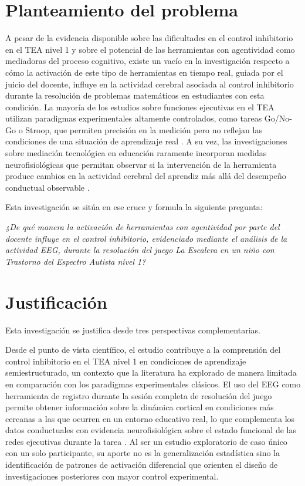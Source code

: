 \documentclass{book}
\begin{document}
\section{Planteamiento del problema}

A pesar de la evidencia disponible sobre las 
dificultades en el control inhibitorio en el TEA 
nivel 1 y sobre el potencial de las herramientas 
con agentividad como mediadoras del proceso 
cognitivo, existe un vacío en la investigación 
respecto a cómo la activación de este tipo de 
herramientas en tiempo real, guiada por el juicio 
del docente, influye en la actividad cerebral 
asociada al control inhibitorio durante la 
resolución de problemas matemáticos en estudiantes 
con esta condición. La mayoría de los estudios 
sobre funciones ejecutivas en el TEA utilizan 
paradigmas experimentales altamente controlados, 
como tareas Go/No-Go o Stroop, que permiten 
precisión en la medición pero no reflejan las 
condiciones de una situación de aprendizaje real 
\cite{Geurts2009, Hill2004}. A su vez, las 
investigaciones sobre mediación tecnológica en 
educación raramente incorporan medidas 
neurofisiológicas que permitan observar si la 
intervención de la herramienta produce cambios 
en la actividad cerebral del aprendiz más allá 
del desempeño conductual observable 
\cite{PaezGonzalez2022}.

Esta investigación se sitúa en ese cruce y 
formula la siguiente pregunta:

\vspace{3mm}
\begin{center}
\textit{¿De qué manera la activación de herramientas 
con agentividad por parte del docente influye en 
el control inhibitorio, evidenciado mediante el 
análisis de la actividad EEG, durante la resolución 
del juego La Escalera en un niño con Trastorno
del Espectro Autista nivel 1?}
\end{center}
\vspace{3mm}

\section{Justificación}

Esta investigación se justifica desde tres 
perspectivas complementarias.

Desde el punto de vista científico, el estudio 
contribuye a la comprensión del control inhibitorio 
en el TEA nivel 1 en condiciones de aprendizaje 
semiestructurado, un contexto que la literatura 
ha explorado de manera limitada en comparación 
con los paradigmas experimentales clásicos. 
El uso del EEG como herramienta de registro 
durante la sesión completa de resolución del 
juego permite obtener información sobre la 
dinámica cortical en condiciones más cercanas 
a las que ocurren en un entorno educativo real, 
lo que complementa los datos conductuales con 
evidencia neurofisiológica sobre el estado 
funcional de las redes ejecutivas durante 
la tarea \cite{Luck2014, Klimesch1999}. 
Al ser un estudio exploratorio de caso único con un
solo participante, su aporte no es la generalización
estadística sino la identificación de patrones 
de activación diferencial que orienten el 
diseño de investigaciones posteriores con 
mayor control experimental.
\end{document}

